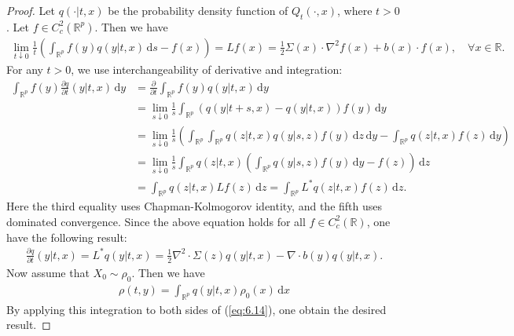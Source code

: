 \documentclass{article}
\numberwithin{equation}{section}
\renewcommand{\d}{\mathrm{d}}
\theoremstyle{plain}
\theoremstyle{definition}
\begin{document}
\begin{proof}
Let $q(\cdot|t,x)$ be the probability density function of $Q_t(\cdot,x)$, where $t>0$. Let $f\in C_c^2(\mathbb{R}^p)$. Then we have
	\begin{align*}
		\lim_{t\downarrow 0}\frac{1}{t}\left(\int_{\mathbb{R}^p} f(y)q(y|t,x)\,\d s - f(x)\right) = Lf(x)= \frac{1}{2}\Sigma(x)\cdot\nabla^2 f(x) + b(x)\cdot f(x),\quad\forall x\in\mathbb{R}.
	\end{align*}
For any $t>0$, we use interchangeability of derivative and integration:
	\begin{align*}
		\int_{\mathbb{R}^p}f(y)\frac{\partial q}{\partial t}(y|t,x)\,\d y &= \frac{\partial}{\partial t}\int_{\mathbb{R}^p}f(y)q(y|t,x)\,\d y\\
		&= \lim_{s\downarrow 0}\frac{1}{s}\int_{\mathbb{R}^p}\left(q(y|t+s,x)-q(y|t,x)\right)f(y)\,\d y\\
		&=\lim_{s\downarrow 0}\frac{1}{s}\left(\int_{\mathbb{R}^p}\int_{\mathbb{R}^p}q(z|t,x)q(y|s,z)f(y)\,\d z\,\d y-\int_{\mathbb{R}^p}q(z|t,x)f(z)\,\d y\right)\\
		&=\lim_{s\downarrow 0}\frac{1}{s}\int_{\mathbb{R}^p}q(z|t,x)\left(\int_{\mathbb{R}^p}q(y|s,z)f(y)\,\d y-f(z)\right)\,\d z\\
		&=\int_{\mathbb{R}^p}q(z|t,x)Lf(z)\,\d z =\int_{\mathbb{R}^p}L^*q(z|t,x)f(z)\,\d z.
	\end{align*}
Here the third equality uses Chapman-Kolmogorov identity, and the fifth uses dominated convergence. Since the above equation holds for all $f\in C_c^2(\mathbb{R})$, one have the following result:
\begin{align*}
	\frac{\partial q}{\partial t}(y|t,x)=L^*q(y|t,x)=\frac{1}{2}\nabla^2\cdot\Sigma(z)q(y|t,x)-\nabla\cdot b(y)q(y|t,x).\label{eq:6.14}\tag{6.14}
\end{align*}
Now assume that $X_0\sim\rho_0$. Then we have
\begin{align*}
	\rho(t,y)=\int_{\mathbb{R}^p}q(y|t,x)\rho_0(x)\,\d x
\end{align*}
By applying this integration to both sides of (\ref{eq:6.14}), one obtain the desired result.
\end{proof}

\newpage
\end{document}
